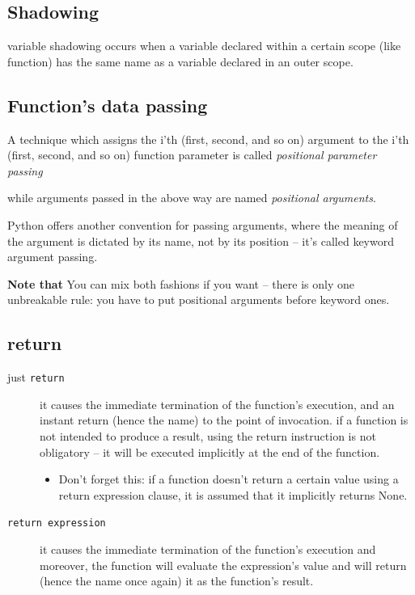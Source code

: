 \documentclass[11pt]{article}
\begin{document}
\subsection{Shadowing}
\label{sec:orga918cc4}
variable shadowing occurs when a variable declared within a certain
scope (like function) has the same name as a
variable declared in an outer scope.
\subsection{Function's data passing}
\label{sec:orgadc5352}
\begin{description}
\item[{Positional parameter passing}] A technique which assigns the i'th (first, second, and so on)
argument to the i'th (first, second, and so on) function
parameter is called \emph{positional parameter passing}
\item[{Positional arguments}] while arguments passed in the above way are named \emph{positional arguments}.
\item[{keyword argument passing}] Python offers another convention for passing arguments, where
the meaning of the argument is dictated by its name, not by its
position – it’s called keyword argument passing.

\item \textbf{Note that} You can mix both fashions if you want – there is only
one unbreakable rule: you have to put positional arguments before
keyword ones.
\end{description}
\subsection{return}
\label{sec:org4fe1a22}
\begin{description}
\item[{just \texttt{return}}] it causes the immediate termination of the function’s execution,
and an instant return (hence the name) to the
point of invocation. if a function is not intended
to produce a result, using the return instruction
is not obligatory – it will be executed implicitly
at the end of the function.
\begin{itemize}
\item Don’t forget this: if a function doesn’t return a certain
value using a return expression clause, it is assumed that
it implicitly returns None.
\end{itemize}
\item[{\texttt{return expression}}] it causes the immediate termination of the function’s execution
and moreover, the function will evaluate the expression’s value
and will return (hence the name once again) it as the function’s
result.
\end{description}
\end{document}
